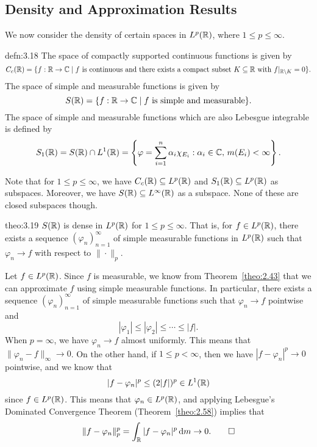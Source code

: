 \subsection{Density and Approximation Results} \label{subsec:3.3}
We now consider the density of certain spaces in $L^p(\mathbb{R})$, where 
$1 \leq p \leq \infty$. 

\begin{defn}{defn:3.18}
    The space of compactly supported continuous functions is given by 
    \[ C_c(\mathbb{R}) = \{f : \mathbb{R} \to \mathbb{C} \mid \text{$f$ is continuous and 
    there exists a compact subset $K \subseteq \mathbb{R}$ with $f|_{\mathbb{R} \setminus K}
    = 0$}\}. \] 
    The space of simple and measurable functions is given by 
    \[ S(\mathbb{R}) = \{f : \mathbb{R} \to \mathbb{C} \mid \text{$f$ is simple and measurable}\}. \] 
    The space of simple and measurable functions which are also Lebesgue 
    integrable is defined by 
    \[ S_1(\mathbb{R}) = S(\mathbb{R}) \cap L^1(\mathbb{R}) = \left\{ \varphi = \sum_{i=1}^n 
    \alpha_i \chi_{E_i} : \alpha_i \in \mathbb{C},\, m(E_i) < \infty \right\}. \] 
\end{defn}

Note that for $1 \leq p \leq \infty$, we have $C_c(\mathbb{R}) \subseteq L^p(\mathbb{R})$ and 
$S_1(\mathbb{R}) \subseteq L^p(\mathbb{R})$ as subspaces. Moreover, we have $S(\mathbb{R}) \subseteq 
L^\infty(\mathbb{R})$ as a subspace. None of these are closed subspaces though. 

\begin{theo}{theo:3.19}
    $S(\mathbb{R})$ is dense in $L^p(\mathbb{R})$ for $1 \leq p \leq \infty$. That is, 
    for $f \in L^p(\mathbb{R})$, there exists a sequence $(\varphi_n)_{n=1}^\infty$ 
    of simple measurable functions in $L^p(\mathbb{R})$ such that 
    $\varphi_n \to f$ with respect to $\|\cdot\|_p$. 
\end{theo}
\begin{pf}
    Let $f \in L^p(\mathbb{R})$. Since $f$ is measurable, we know from Theorem~\ref{theo:2.43} 
    that we can approximate $f$ using simple measurable functions. In particular, 
    there exists a sequence $(\varphi_n)_{n=1}^\infty$ of simple measurable 
    functions such that $\varphi_n \to f$ pointwise and 
    \[ |\varphi_1| \leq |\varphi_2| \leq \cdots \leq |f|. \] 
    When $p = \infty$, we have $\varphi_n \to f$ almost uniformly. 
    This means that $\|\varphi_n - f\|_\infty \to 0$. On the other hand, 
    if $1 \leq p < \infty$, then we have $|f - \varphi_n|^p \to 0$ 
    pointwise, and we know that 
    \[ |f - \varphi_n|^p \leq (2|f|)^p \in L^1(\mathbb{R}) \] 
    since $f \in L^p(\mathbb{R})$. This means that $\varphi_n \in L^p(\mathbb{R})$, 
    and applying Lebesgue's Dominated Convergence Theorem (Theorem~\ref{theo:2.58})
    implies that 
    \[ \|f - \varphi_n\|_p^p = \int_{\mathbb{R}} |f - \varphi_n|^p\,\mathrm{d} m \to 0. \qedhere \] 
\end{pf}

